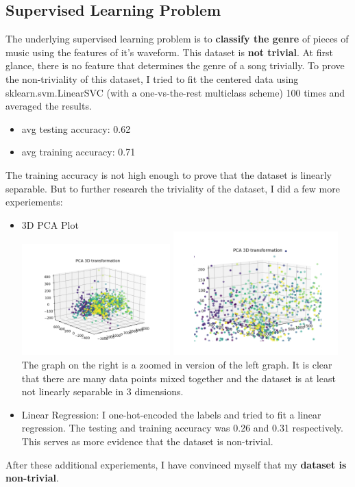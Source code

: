 \documentclass[12pt]{article}
\begin{document}
\subsection{Supervised Learning Problem}
The underlying supervised learning problem is to \textbf{classify the genre} of pieces of music using the features of it's waveform. This dataset is \textbf{not trivial}. At first glance, there is no feature that determines the genre of a song trivially. To prove the non-triviality of this dataset, I tried to fit the centered data using sklearn.svm.LinearSVC (with a one-vs-the-rest multiclass scheme) 100 times and averaged the results.
\begin{itemize}
    \item avg testing accuracy: 0.62
    \item avg training accuracy: 0.71
\end{itemize}
The training accuracy is not high enough to prove that the dataset is linearly separable. But to further research the triviality of the dataset, I did a few more experiements:
\begin{itemize}
    \item 3D PCA Plot
    \\ \includegraphics[width=0.45\textwidth]{pca0} \includegraphics[width=0.5\textwidth]{pca1}
    \\ The graph on the right is a zoomed in version of the left graph. It is clear that there are many data points mixed together and the dataset is at least not linearly separable in 3 dimensions.
    \item Linear Regression: I one-hot-encoded the labels and tried to fit a linear regression. The testing and training accuracy was 0.26 and 0.31 respectively. This serves as more evidence that the dataset is non-trivial.
\end{itemize}
After these additional experiements, I have convinced myself that my \textbf{dataset is non-trivial}.
\end{document}
